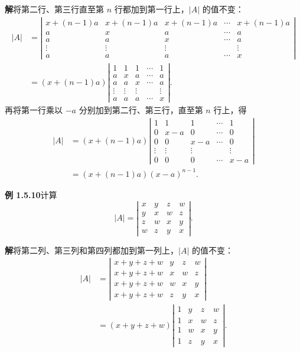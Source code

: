 \documentclass[UTF8,12pt,a4paper,fontset=fandol]{ctexart}
\begin{document}
\noindent\textbf{解}\quad 将第二行、第三行直至第 $n$ 行都加到第一行上，$|A|$ 的值不变：
\[
\begin{aligned}
|A|
&=
\left|\begin{array}{ccccc}
x+(n-1)a & x+(n-1)a & x+(n-1)a & \cdots & x+(n-1)a\\
a & x & a & \cdots & a\\
a & a & x & \cdots & a\\
\vdots & \vdots & \vdots & & \vdots\\
a & a & a & \cdots & x
\end{array}\right|\\
&=(x+(n-1)a)
\left|\begin{array}{ccccc}
1 & 1 & 1 & \cdots & 1\\
a & x & a & \cdots & a\\
a & a & x & \cdots & a\\
\vdots & \vdots & \vdots & & \vdots\\
a & a & a & \cdots & x
\end{array}\right|.
\end{aligned}
\]
再将第一行乘以 $-a$ 分别加到第二行、第三行，直至第 $n$ 行上，得
\[
\begin{aligned}
|A|
&=(x+(n-1)a)
\left|\begin{array}{ccccc}
1 & 1 & 1 & \cdots & 1\\
0 & x-a & 0 & \cdots & 0\\
0 & 0 & x-a & \cdots & 0\\
\vdots & \vdots & \vdots & & \vdots\\
0 & 0 & 0 & \cdots & x-a
\end{array}\right|\\
&=(x+(n-1)a)(x-a)^{n-1}.
\end{aligned}
\]

\noindent\textbf{例 1.5.10}\quad 计算
\[
|A|=
\left|\begin{array}{rrrr}
x & y & z & w\\
y & x & w & z\\
z & w & x & y\\
w & z & y & x
\end{array}\right|.
\]

\noindent\textbf{解}\quad 将第二列、第三列和第四列都加到第一列上，$|A|$ 的值不变：
\[
\begin{aligned}
|A|
&=
\left|\begin{array}{rrrr}
x+y+z+w & y & z & w\\
x+y+z+w & x & w & z\\
x+y+z+w & w & x & y\\
x+y+z+w & z & y & x
\end{array}\right|\\
&=(x+y+z+w)
\left|\begin{array}{rrrr}
1 & y & z & w\\
1 & x & w & z\\
1 & w & x & y\\
1 & z & y & x
\end{array}\right|.
\end{aligned}
\]
\end{document}
